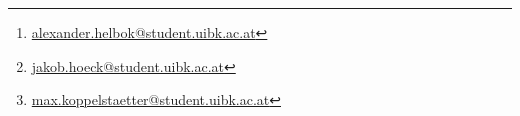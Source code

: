 \thispagestyle{empty}
\titlehead{\texttt{[image: logo.jpg]}}
\title{\settitle}
\author{Alexander Helbok\thanks{\href{mailto:alexander.helbok@student.uibk.ac.at}{alexander.helbok@student.uibk.ac.at}},
		Jakob Höck \thanks{\href{mailto:jakob.hoeck@student.uibk.ac.at}{jakob.hoeck@student.uibk.ac.at}},
		Max Koppelstätter\thanks{\href{mailto:max.koppelstaetter@student.uibk.ac.at}{max.koppelstaetter@student.uibk.ac.at}}}
\date{\today}
\maketitle
\vfill

